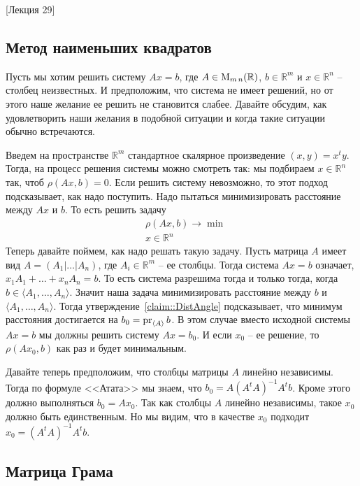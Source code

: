[Лекция 29]


\subsection{Метод наименьших квадратов}

Пусть мы хотим решить систему $Ax = b$, где $A\in \operatorname{M}_{m\,n}(\mathbb R)$, $b\in \mathbb R^m$ и $x\in \mathbb R^n$ -- столбец неизвестных.
И предположим, что система не имеет решений, но от этого наше желание ее решить не становится слабее.
Давайте обсудим, как удовлетворить наши желания в подобной ситуации и когда такие ситуации обычно встречаются.

Введем на пространстве $\mathbb R^m$ стандартное скалярное произведение $(x,y) = x^t y$.
Тогда, на процесс решения системы можно смотреть так: мы подбираем $x\in \mathbb R^n$ так, чтоб $\rho(Ax, b) = 0$.
Если решить систему невозможно, то этот подход подсказывает, как надо поступить.
Надо пытаться минимизировать расстояние между $Ax$ и $b$.
То есть решить задачу
\[
\begin{aligned}
&\rho(Ax, b)\to \min\\
&x\in \mathbb R^n
\end{aligned}
\]
Теперь давайте поймем, как надо решать такую задачу.
Пусть матрица $A$ имеет вид $A = (A_1|\ldots|A_n)$, где $A_i\in \mathbb R^m$ -- ее столбцы.
Тогда система $Ax = b$ означает, $x_1A_1 + \ldots + x_n A_n = b$.
То есть система разрешима тогда и только тогда, когда $b\in \langle A_1,\ldots, A_n\rangle$.
Значит наша задача минимизировать расстояние между $b$ и $\langle A_1,\ldots,A_n\rangle$.
Тогда утверждение~\ref{claim::DistAngle} подсказывает, что минимум расстояния достигается на $b_0 = \operatorname{pr}_{\langle A\rangle}b$.
В этом случае вместо исходной системы $Ax = b$ мы должны решить систему $Ax = b_0$.
И если $x_0$ -- ее решение, то $\rho(Ax_0, b)$ как раз и будет минимальным.

Давайте теперь предположим, что столбцы матрицы $A$ линейно независимы.
Тогда по формуле <<Атата>> мы знаем, что $b_0 = A(A^tA)^{-1}A^tb$.
Кроме этого должно выполняться $b_0 = Ax_0$.
Так как столбцы $A$ линейно независимы, такое $x_0$ должно быть единственным.
Но мы видим, что в качестве $x_0$ подходит $x_0 = (A^tA)^{-1}A^tb$.

\subsection{Матрица Грама}
\label{subsection::Gram}

